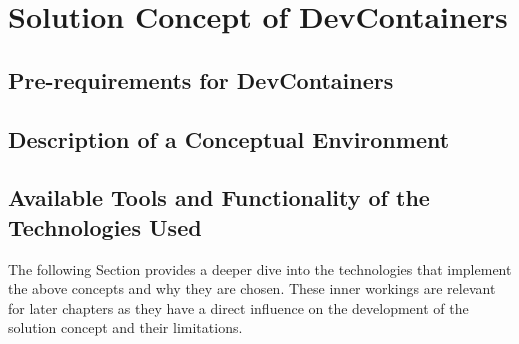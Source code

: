 \documentclass[12pt, a4paper]{article}
\begin{document}
\section{Solution Concept of DevContainers}\label{sec::solution_concept}
    \subsection{Pre-requirements for DevContainers}
    \subsection{Description of a Conceptual Environment}
    \subsection{Available Tools and Functionality of the Technologies Used}\label{ssec::toolsused}
    The following Section provides a deeper dive into the technologies that implement the above concepts and why they are chosen. These inner workings are relevant for later chapters as they have a direct influence on the development of the solution concept and their limitations.
\end{document}
